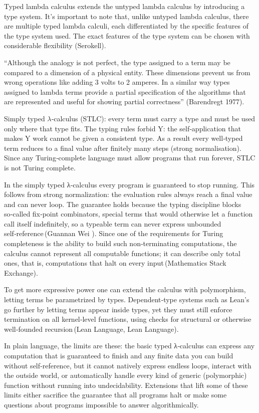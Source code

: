 \documentclass{article}
\newcommand{\1}{\mathbbm{1}}
\theoremstyle{plain}
\theoremstyle{definition}
\numberwithin{equation}{section}
\begin{document}
Typed lambda calculus extends the untyped lambda calculus by introducing a type system. It’s important to note that, unlike untyped lambda calculus, there are multiple typed lambda calculi, each differentiated by the specific features of the type system used. The exact features of the type system can be chosen with considerable flexibility (Serokell).  

“Although the analogy is not perfect, the type assigned to a term may be compared to a dimension of a physical entity. These dimensions prevent us from wrong operations like adding 3 volts to 2 amperes. In a similar way types assigned to lambda terms provide a partial specification of the algorithms that are represented and useful for showing partial correctness” (Barendregt 1977). 

Simply typed $\lambda$‑calculus (STLC): every term must carry a type and must be used only where that type fits. The typing rules forbid Y: the self‑application that makes Y work cannot be given a consistent type. As a result every well‑typed term reduces to a final value after finitely many steps (strong normalisation). Since any Turing‑complete language must allow programs that run forever, STLC is not Turing complete.

In the simply typed λ‑calculus every program is guaranteed to stop running. This follows from strong normalization: the evaluation rules always reach a final value and can never loop. The guarantee holds because the typing discipline blocks so‑called fix‑point combinators, special terms that would otherwise let a function call itself indefinitely, so a typeable term can never express unbounded self‑reference (Guannan Wei ). Since one of the requirements for Turing completeness is the ability to build such non‑terminating computations, the calculus cannot represent all computable functions; it can describe only total ones, that is, computations that halt on every input (Mathematics Stack Exchange).

To get more expressive power one can extend the calculus with polymorphism, letting terms be parametrized by types. Dependent‑type systems such as Lean’s go further by letting terms appear inside types, yet they must still enforce termination on all kernel‑level functions, using checks for structural or otherwise well‑founded recursion (Lean Language, Lean Language).

In plain language, the limits are these: the basic typed λ‑calculus can express any computation that is guaranteed to finish and any finite data you can build without self‑reference, but it cannot natively express endless loops, interact with the outside world, or automatically handle every kind of generic (polymorphic) function without running into undecidability. Extensions that lift some of these limits either sacrifice the guarantee that all programs halt or make some questions about programs impossible to answer algorithmically.
\end{document}
